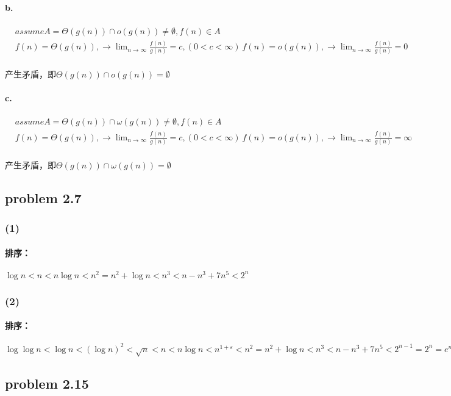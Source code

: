 \documentclass[11pt]{ctexart}
\begin{document}
	\paragraph{b.}
	$
	\begin{aligned}
	&assume A=\Theta(g(n))\cap o(g(n))\neq\emptyset,f(n)\in A \\
	&f(n)=\Theta(g(n)),\rightarrow \lim_{n \to \infty}\frac{f(n)}{g(n)}=c,(0<c<\infty)
	\ f(n)=o(g(n)),\rightarrow \lim_{n \to \infty}\frac{f(n)}{g(n)}=0
	\end{aligned}
	$\\
	\\
	产生矛盾，即$\Theta(g(n))\cap o(g(n))=\emptyset$
	\paragraph{c.}
	$
	\begin{aligned}
	&assume A=\Theta(g(n))\cap \omega(g(n))\neq\emptyset,f(n)\in A \\
	&f(n)=\Theta(g(n)),\rightarrow \lim_{n \to \infty}\frac{f(n)}{g(n)}=c,(0<c<\infty)
	\ f(n)=o(g(n)),\rightarrow \lim_{n \to \infty}\frac{f(n)}{g(n)}=\infty
	\end{aligned}
	$\\
	\\
	产生矛盾，即$\Theta(g(n))\cap \omega(g(n))=\emptyset$
	\newpage
	\subsection*{problem 2.7}
	\subsubsection*{(1)}
	\paragraph{排序：}
	$\log n<n<n\log n<n^2=n^2+\log n<n^3<n-n^3+7n^5<2^n$
	\subsubsection*{(2)}
	\paragraph{排序：}
	$\log\log n<\log n<(\log n)^2<\sqrt{n}<n<n\log n<n^{1+\varepsilon}<n^2=n^2+\log n<n^3<n-n^3+7n^5<2^{n-1}=2^n=e^n<n!$
	\subsection*{problem 2.15}
\end{document}
